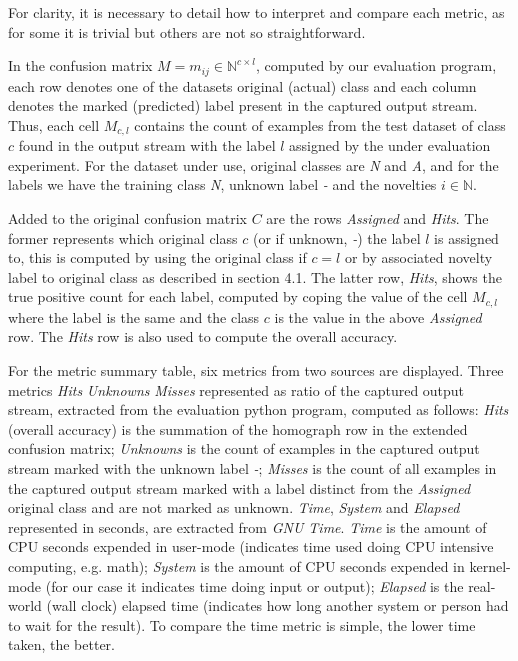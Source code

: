 \documentclass[conference]{IEEEtran}
\begin{document}
For clarity, it is necessary to detail how to interpret and compare each metric,
as for some it is trivial but others are not so straightforward.

In the confusion matrix $M = m_{ij} \in \mathbb{N} ^{c \times{} l}$,
computed by our evaluation program,
each row denotes one of the datasets original (actual) class
and each column denotes the marked (predicted) label present in the captured output stream.
Thus, each cell $M_{c, l}$ contains the count of examples from the test dataset of class $c$
found in the output stream with the label $l$ assigned by the under evaluation experiment.
For the dataset under use, original classes are \emph{N} and \emph{A}, and
for the labels we have the training class \emph{N}, unknown label \emph{-} and
the novelties $i \in \mathbb{N}$.

Added to the original confusion matrix $C$ are the rows \emph{Assigned} and
\emph{Hits}.
The former represents which original class $c$ (or if unknown, \emph{-}) the
label $l$ is assigned to, this is computed by using the original class if
$c = l$ or by associated novelty label to original class as described in
\cite{DeFaria2015} section 4.1.
The latter row, \emph{Hits}, shows the true positive count for each label,
computed by coping the value of the cell $M_{c, l}$ where the label is the same
and the class $c$ is the value in the above \emph{Assigned} row.
The \emph{Hits} row is also used to compute the overall accuracy.

For the metric summary table, six metrics from two sources are displayed.
Three metrics \emph{Hits} \emph{Unknowns} \emph{Misses} represented as ratio of the
captured output stream, extracted from the evaluation python
program, computed as follows:
\emph{Hits} (overall accuracy) is the summation of the homograph row in the
extended confusion matrix;
\emph{Unknowns} is the count of examples in the captured output stream marked
with the unknown label \emph{-};
\emph{Misses} is the count of all examples in the captured output stream marked
with a label distinct from the \emph{Assigned} original class and are not marked
as unknown.
\emph{Time}, \emph{System} and \emph{Elapsed} represented in seconds,
are extracted from \emph{GNU Time}.
\emph{Time} is the amount of CPU seconds expended in user-mode
(indicates time used doing CPU intensive computing, e.g. math);
\emph{System} is the amount of CPU seconds expended in kernel-mode
(for our case it indicates time doing input or output);
\emph{Elapsed} is the real-world (wall clock) elapsed time
(indicates how long another system or person had to wait for the result).
To compare the time metric is simple, the lower time taken, the better.
\end{document}
